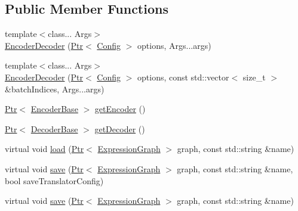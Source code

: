 \subsection*{Public Member Functions}
\begin{DoxyCompactItemize}
\item 
{\footnotesize template$<$class... Args$>$ }\\\hyperlink{classmarian_1_1EncoderDecoder_ac08c9c6cf3847fd500b4d2bdf3470382}{Encoder\+Decoder} (\hyperlink{namespacemarian_ad1a373be43a00ef9ce35666145137b08}{Ptr}$<$ \hyperlink{classmarian_1_1Config}{Config} $>$ options, Args...\+args)
\item 
{\footnotesize template$<$class... Args$>$ }\\\hyperlink{classmarian_1_1EncoderDecoder_abd0caec06ebcf39e71c074cd8dcb7e61}{Encoder\+Decoder} (\hyperlink{namespacemarian_ad1a373be43a00ef9ce35666145137b08}{Ptr}$<$ \hyperlink{classmarian_1_1Config}{Config} $>$ options, const std\+::vector$<$ size\+\_\+t $>$ \&batch\+Indices, Args...\+args)
\item 
\hyperlink{namespacemarian_ad1a373be43a00ef9ce35666145137b08}{Ptr}$<$ \hyperlink{classmarian_1_1EncoderBase}{Encoder\+Base} $>$ \hyperlink{classmarian_1_1EncoderDecoder_ae8e8facb50d27fb952f673f97ca5ca22}{get\+Encoder} ()
\item 
\hyperlink{namespacemarian_ad1a373be43a00ef9ce35666145137b08}{Ptr}$<$ \hyperlink{classmarian_1_1DecoderBase}{Decoder\+Base} $>$ \hyperlink{classmarian_1_1EncoderDecoder_a112eff919d3e05aa57616cad4dccd09c}{get\+Decoder} ()
\item 
virtual void \hyperlink{classmarian_1_1EncoderDecoder_af535052d08f862bbeefe55052886c44f}{load} (\hyperlink{namespacemarian_ad1a373be43a00ef9ce35666145137b08}{Ptr}$<$ \hyperlink{classmarian_1_1ExpressionGraph}{Expression\+Graph} $>$ graph, const std\+::string \&name)
\item 
virtual void \hyperlink{classmarian_1_1EncoderDecoder_a16a607b6b5f58ebe1457d2109653daa6}{save} (\hyperlink{namespacemarian_ad1a373be43a00ef9ce35666145137b08}{Ptr}$<$ \hyperlink{classmarian_1_1ExpressionGraph}{Expression\+Graph} $>$ graph, const std\+::string \&name, bool save\+Translator\+Config)
\item 
virtual void \hyperlink{classmarian_1_1EncoderDecoder_a4ae96d1149cd6d1952a5af26c02276b4}{save} (\hyperlink{namespacemarian_ad1a373be43a00ef9ce35666145137b08}{Ptr}$<$ \hyperlink{classmarian_1_1ExpressionGraph}{Expression\+Graph} $>$ graph, const std\+::string \&name)
\item 

\end{DoxyCompactItemize}
